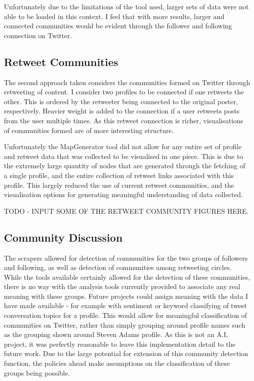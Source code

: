 Unfortunately due to the limitations of the tool used, larger sets of data were not able to be loaded in this context. I feel that with more results, larger and connected communities would be evident through the follower and following connection on Twitter.

\subsection{Retweet Communities}

The second approach taken considers the communities formed on Twitter through retweeting of content. I consider two profiles to be connected if one retweets the other. This is ordered by the retweeter being connected to the original poster, respectively. Heavier weight is added to the connection if a user retweets posts from the user multiple times. As this retweet connection is richer, visualisations of communities formed are of more interesting structure. 

Unfortunately the MapGenerator tool did not allow for any entire set of profile and retweet data that was collected to be visualised in one piece. This is due to the extremely large quantity of nodes that are generated through the fetching of a single profile, and the entire collection of retweet links associated with this profile. This largely reduced the use of current retweet communities, and the visualisation options for generating meaningful understanding of data collected. 

TODO - INPUT SOME OF THE RETWEET COMMUNITY FIGURES HERE.

\subsection{Community Discussion}

The scrapers allowed for detection of communities for the two groups of followers and following, as well as detection of communities among retweeting circles. While the tools available certainly allowed for the detection of these communities, there is no way with the analysis tools currently provided to associate any real meaning with these groups. Future projects could assign meaning with the data I have made available - for example with sentiment or keyword classifying of tweet conversation topics for a profile. This would allow for meaningful classification of communities on Twitter, rather than simply grouping around profile names such as the grouping shown around Steven Adams profile. As this is not an A.I. project, it was perfectly reasonable to leave this implementation detail to the future work. Due to the large potential for extension of this community detection function, the policies ahead make assumptions on the classification of these groups being possible. 

